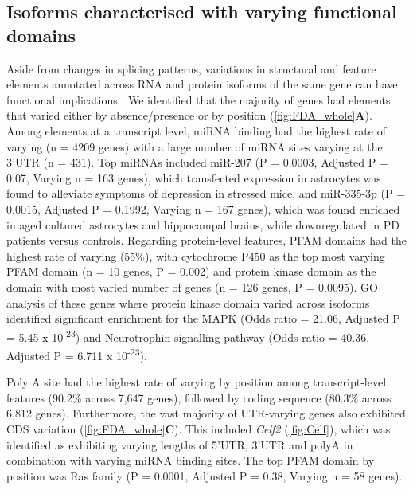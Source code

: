 \subsection{Isoforms characterised with varying functional domains}
Aside from changes in splicing patterns, variations in structural and feature elements annotated across RNA and protein isoforms of the same gene can have functional implications \cite{DeLaFuente2020}. We identified that the majority of genes had elements that varied either by absence/presence or by position (\cref{fig:FDA_whole}\textbf{A}). Among elements at a transcript level, miRNA binding had the highest rate of varying (n = 4209 genes) with a large number of miRNA sites varying at the 3'UTR (n = 431). Top miRNAs included miR-207 (P = 0.0003, Adjusted P = 0.07, Varying n = 163 genes), which transfected expression in astrocytes was found to alleviate symptoms of depression in stressed mice\cite{Li2020}, and miR-335-3p (P = 0.0015, Adjusted P = 0.1992, Varying n = 167 genes), which was found enriched in aged cultured astrocytes and hippocampal brains\cite{Raihan2018}, while downregulated in PD patients versus controls\cite{Oliveira2020}. 
Regarding protein-level features, PFAM domains had the highest rate of varying (55\%), with cytochrome P450 as the top most varying PFAM domain (n = 10 genes, P = 0.002) and protein kinase domain as the domain with most varied number of genes (n = 126 genes, P = 0.0095). GO analysis of these genes where protein kinase domain varied across isoforms identified significant enrichment for the MAPK (Odds ratio = 21.06, Adjusted P = 5.45 x 10\textsuperscript{-23}) and Neurotrophin signalling pathway (Odds ratio = 40.36, Adjusted P = 6.711 x 10\textsuperscript{-23}). 

Poly A site had the highest rate of varying by position among transcript-level features (90.2\% across 7,647 genes), followed by coding sequence (80.3\% across 6,812 genes). Furthermore, the vast majority of UTR-varying genes also exhibited CDS variation (\cref{fig:FDA_whole}\textbf{C}). This included \textit{Celf2} (\cref{fig:Celf}), which was identified as exhibiting varying lengths of 5'UTR, 3'UTR and polyA in combination with varying miRNA binding sites. The top PFAM domain by position was Ras family (P = 0.0001, Adjusted P = 0.38, Varying n = 58 genes). 


